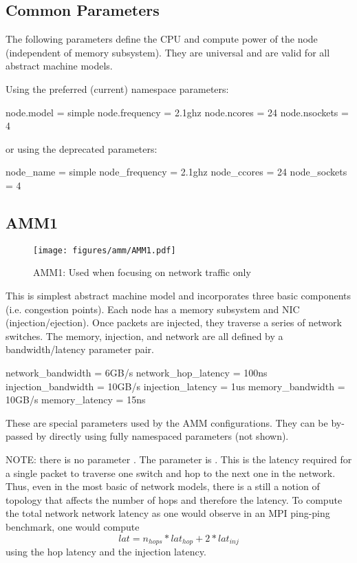 \subsection{Common Parameters}
The following parameters define the CPU and compute power of the node (independent of memory subsystem).
They are universal and are valid for all abstract machine models.

Using the preferred (current) namespace parameters:
\begin{ViFile}
node.model = simple
node.frequency = 2.1ghz
node.ncores = 24
node.nsockets = 4
\end{ViFile}

or using the deprecated parameters:
\begin{ViFile}
node_name = simple
node_frequency = 2.1ghz
node_ccores = 24
node_sockets = 4
\end{ViFile}

\subsection{AMM1}
\label{subsec:ammOne}

\begin{figure}[h!]
\begin{center}
\texttt{[image: figures/amm/AMM1.pdf]}
\end{center}
\caption{AMM1: Used when focusing on network traffic only}
\label{fig:amm1}
\end{figure}

This is simplest abstract machine model and incorporates three basic components (i.e. congestion points).
Each node has a memory subsystem and NIC (injection/ejection).
Once packets are injected, they traverse a series of network switches.
The memory, injection, and network are all defined by a bandwidth/latency parameter pair.

\begin{ViFile}
network_bandwidth = 6GB/s
network_hop_latency = 100ns
injection_bandwidth = 10GB/s
injection_latency = 1us
memory_bandwidth = 10GB/s
memory_latency = 15ns
\end{ViFile}

These are special parameters used by the AMM configurations.
They can be by-passed by directly using fully namespaced parameters (not shown).

NOTE: there is no parameter .
The parameter is .
This is the latency required for a single packet to traverse one switch and hop to the next one in the network.
Thus, even in the most basic of network models, there is a still a notion of topology that affects the number of hops and therefore the latency.
To compute the total network network latency as one would observe in an MPI ping-ping benchmark, one would compute
\[
lat = n_{hops} * lat_{hop} + 2*lat_{inj}
\]
using the hop latency and the injection latency.

